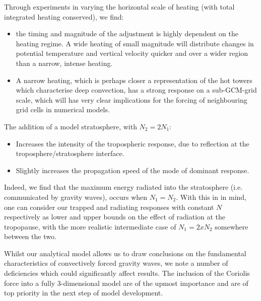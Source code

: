 \documentclass[a4paper,10pt]{article}
\begin{document}
Through experiments in varying the horizontal scale of heating (with total integrated heating conserved), we find:
\begin{itemize}
 \item the timing and magnitude of the adjustment is highly dependent on the heating regime. A wide heating of small magnitude will distribute changes in potential temperature and vertical velocity quicker and over a wider region than a narrow, intense heating. 
 \item A narrow heating, which is perhaps closer a representation of the hot towers which characterise deep convection, has a strong response on a sub-GCM-grid scale, which will has very clear implications 
for the forcing of neighbouring grid cells in numerical models.
\end{itemize}
The addition of a model stratosphere, with $N_2 = 2 N_1$:
\begin{itemize}
 \item Increases the intensity of the tropospheric response, due to reflection at the troposphere/stratosphere interface.
 \item Slightly increases the propagation speed of the mode of dominant response.
\end{itemize}
Indeed, we find that the maximum energy radiated into the stratosphere (i.e. communicated by gravity waves), occurs when $N_1 = N_2$. With this in in mind, one can consider our trapped and radiating responses with constant $N$ respectively as lower and upper bounds on the effect of radiation at the tropopause, with the more realistic intermediate case of $N_1 = 2 x N_2$ somewhere between the two.

Whilst our analytical model allows us to draw conclusions on the fundamental characteristics of convectively forced gravity waves, we note a number of deficiencies which could significantly affect results. 
The inclusion of the Coriolis force into a fully 3-dimensional model are of the upmost importance and are of top priority in the next step of model development. 

\pagebreak
%
%
%


%
\end{document}
